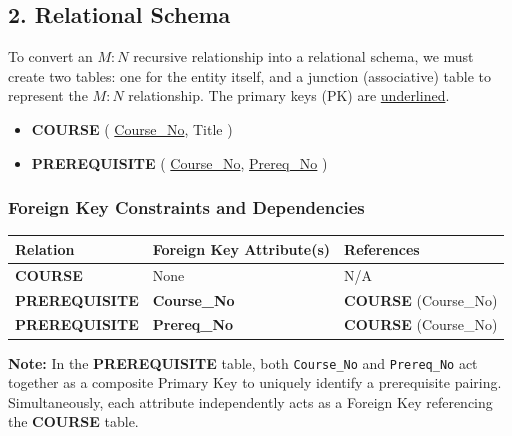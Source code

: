\documentclass[12pt,a3paper]{article}
\begin{document}
\begin{enumerate}
\begin{tcolorbox}[enhanced,breakable,ansbox,colback=cA!4,colframe=cA,boxrule=0.8pt,arc=5pt,title={\textbf{Answer}},fonttitle=\bfseries\color{white},colbacktitle=cA]
\begin{center}
\begin{tikzpicture}
\end{tikzpicture}
\end{center}
\vspace{1em}

\subsection*{2. Relational Schema}

To convert an $M:N$ recursive relationship into a relational schema, we must create two tables: one for the entity itself, and a junction (associative) table to represent the $M:N$ relationship. The primary keys (PK) are \underline{underlined}.

\vspace{1em}

\begin{itemize}[leftmargin=2em, itemsep=1em]
    \item \textbf{COURSE} ( \underline{Course\_No}, Title )
    \item \textbf{PREREQUISITE} ( \underline{Course\_No}, \underline{Prereq\_No} )
\end{itemize}

\vspace{1em}

\subsubsection*{Foreign Key Constraints and Dependencies}

\begin{center}
\renewcommand{\arraystretch}{1.4}
\begin{tabular}{@{} l l l @{}}
\toprule
\textbf{Relation} & \textbf{Foreign Key Attribute(s)} & \textbf{References} \\
\midrule
\textbf{COURSE}       & None & N/A \\
\textbf{PREREQUISITE} & \textbf{Course\_No} & \textbf{COURSE} (Course\_No) \\
\textbf{PREREQUISITE} & \textbf{Prereq\_No} & \textbf{COURSE} (Course\_No) \\
\bottomrule
\end{tabular}
\end{center}

\vspace{0.5em}
\textbf{Note:} In the \textbf{PREREQUISITE} table, both \texttt{Course\_No} and \texttt{Prereq\_No} act together as a composite Primary Key to uniquely identify a prerequisite pairing. Simultaneously, each attribute independently acts as a Foreign Key referencing the \textbf{COURSE} table.


\end{tcolorbox}
\end{enumerate}
\end{document}
